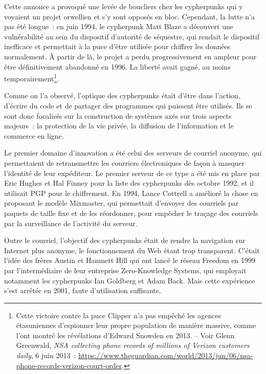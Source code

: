 \documentclass[
  a5paper,
  smalldemyvopaper,10pt,twoside,onecolumn,openright,extrafontsizes,hidelinks]{memoir}
\begin{document}
Cette annonce a provoqué une levée de boucliers chez les cypherpunks qui
y voyaient un projet orwellien et s'y sont opposés en bloc. Cependant,
la lutte n'a pas été longue~: en juin 1994, le cypherpunk Matt Blaze a
découvert une vulnérabilité au sein du dispositif d'autorité de
séquestre, qui rendait le dispositif inefficace et permettait à la puce
d'être utilisée pour chiffrer les données normalement. À partir de là,
le projet a perdu progressivement en ampleur pour être définitivement
abandonné en 1996. La liberté avait gagné, au moins
temporairement\footnote{Cette victoire contre la puce Clipper n'a pas
  empêché les agences étasuniennes d'espionner leur propre population de
  manière massive, comme l'ont montré les révélations d'Edward Snowden
  en 2013. -- Voir Glenn Greenwald, \emph{NSA collecting phone records
  of millions of Verizon customers daily}, 6 juin 2013~:
  \url{https://www.theguardian.com/world/2013/jun/06/nsa-phone-records-verizon-court-order}.}.

Comme on l'a observé, l'optique des cypherpunks était d'être dans
l'action, d'écrire du code et de partager des programmes qui puissent
être utilisés. Ils se sont donc focalisés sur la construction de
systèmes axés sur trois aspects majeurs~: la protection de la vie
privée, la diffusion de l'information et le commerce en ligne.

Le premier domaine d'innovation a été celui des serveurs de courriel
anonyme, qui permettaient de retransmettre les courriers électroniques
de façon à masquer l'identité de leur expéditeur. Le premier serveur de
ce type a été mis en place par Eric Hughes et Hal Finney pour la liste
des cypherpunks dès octobre 1992, et il utilisait PGP pour le
chiffrement. En 1994, Lance Cottrell a amélioré la chose en proposant le
modèle Mixmaster, qui permettait d'envoyer des courriels par paquets de
taille fixe et de les réordonner, pour empêcher le traçage des courriels
par la surveillance de l'activité du serveur.

Outre le courriel, l'objectif des cypherpunks était de rendre la
navigation sur Internet plus anonyme, le fonctionnement du Web étant
trop transparent. C'était l'idée des frères Austin et Hamnett Hill qui
ont lancé le réseau Freedom en 1999 par l'intermédiaire de leur
entreprise Zero-Knowledge Systems, qui employait notamment les
cypherpunks Ian Goldberg et Adam Back. Mais cette expérience s'est
arrêtée en 2001, faute d'utilisation suffisante.
\end{document}
